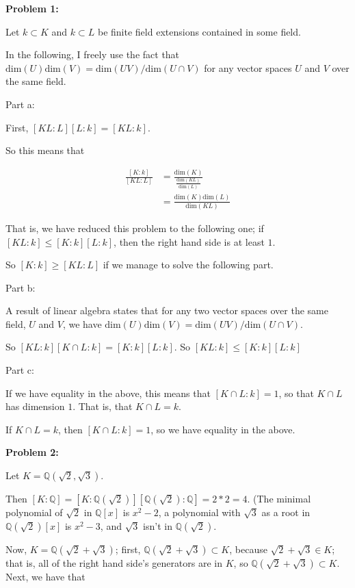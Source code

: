 \documentclass[a4paper,12pt]{article}
\newcommand{\shunt}{\vspace{20mm}}
\newcommand{\Q}{\mathbb{Q}}
\begin{document}
{\bf Problem 1:} 

Let $k \subset K$ and $k \subset L$ be finite field extensions contained in some field. 

In the following, I freely use the fact that $\text{dim}(U)\text{dim}(V) = \text{dim}(UV)/\text{dim}(U \cap V)$ for any vector spaces $U$ and $V$ over the same field. 

Part a:

First, $[KL:L][L:k] = [KL:k]$.

So this means that

\begin{align*}
\frac{[K:k]}{[KL:L]} &= \frac{\text{dim}(K)}{\frac{\text{dim}(KL)}{\text{dim}(L)}}\\
&= \frac{\text{dim}(K)\text{dim}(L)}{\text{dim}(KL)}
\end{align*}

That is, we have reduced this problem to the following one; if $[KL:k] \leq [K:k][L:k]$, then the right hand side is at least $1$.

So $[K:k] \geq [KL:L]$ if we manage to solve the following part.

\shunt 

Part b:

A result of linear algebra states that for any two vector spaces over the same field, $U$ and $V$, we have $\text{dim}(U)\text{dim}(V) = \text{dim}(UV)/\text{dim}(U \cap V)$.%

So $[KL:k][K \cap L:k] = [K:k][L:k]$. So $[KL:k] \leq [K:k][L:k]$

\shunt 

Part c:

If we have equality in the above, this means that $[K \cap L:k] = 1$, so that $K \cap L$ has dimension $1$. That is, that $K \cap L = k$.

If $K \cap L = k$, then $[K \cap L:k] = 1$, so we have equality in the above.

\shunt

{\bf Problem 2:} 

Let $K = \Q(\sqrt{2},\sqrt{3})$.

Then $[K:\Q] = [K:\Q(\sqrt{2})][\Q(\sqrt{2}):\Q] = 2*2=4$. (The minimal polynomial of $\sqrt{2}$ in $\Q[x]$ is $x^2-2$, a polynomial with $\sqrt{3}$ as a root in $\Q(\sqrt{2})[x]$ is $x^2-3$, and $\sqrt{3}$ isn't in $\Q(\sqrt{2})$.

Now, $K = \Q(\sqrt{2}+\sqrt{3})$;  first, $\Q(\sqrt{2}+\sqrt{3}) \subset K$, because $\sqrt{2}+\sqrt{3} \in K$; that is, all of the right hand side's generators are in $K$, so $\Q(\sqrt{2}+\sqrt{3}) \subset K$. Next, we have that
\end{document}
